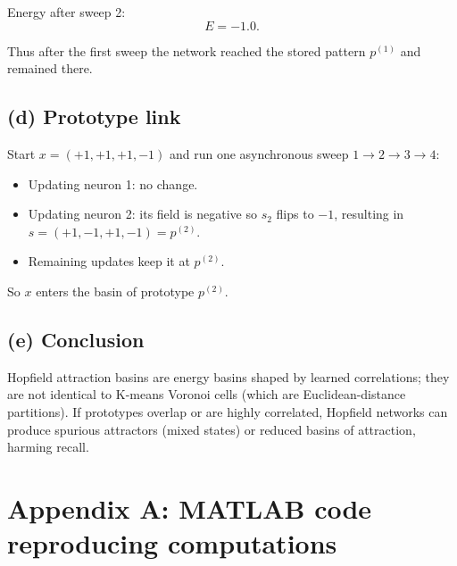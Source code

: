 \documentclass[11pt,a4paper]{article}
\begin{document}
Energy after sweep 2:
\[
E=-1.0.
\]

Thus after the first sweep the network reached the stored pattern \(p^{(1)}\) and remained there.

\subsection{(d) Prototype link}
Start \(x=(+1,+1,+1,-1)\) and run one asynchronous sweep \(1\to2\to3\to4\):
\begin{itemize}
  \item Updating neuron 1: no change.
  \item Updating neuron 2: its field is negative so \(s_2\) flips to \(-1\), resulting in \(s=(+1,-1,+1,-1)=p^{(2)}\).
  \item Remaining updates keep it at \(p^{(2)}\).
\end{itemize}
So \(x\) enters the basin of prototype \(p^{(2)}\).

\subsection{(e) Conclusion}
Hopfield attraction basins are energy basins shaped by learned correlations; they are not identical to K-means Voronoi cells (which are Euclidean-distance partitions). If prototypes overlap or are highly correlated, Hopfield networks can produce spurious attractors (mixed states) or reduced basins of attraction, harming recall.

\appendix
\section{Appendix A: MATLAB code reproducing computations}
\label{app:matlab}
\end{document}
